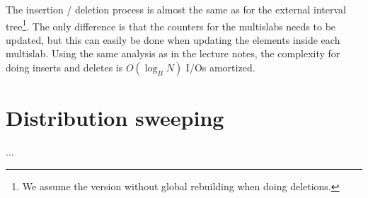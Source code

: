 \documentclass[a4paper,12pt]{article}
\begin{document}
The insertion / deletion process is almost the same as for the external interval tree\footnote{We assume the version without global rebuilding when doing deletions.}. The only difference is that the counters for the multislabs needs to be updated, but this can easily be done when updating the elements inside each multislab. Using the same analysis as in the lecture notes, the complexity for doing inserts and deletes is $O(\log_B N)$ I/Os amortized.

\pagebreak
\section{Distribution sweeping}

...

%
\end{document}
